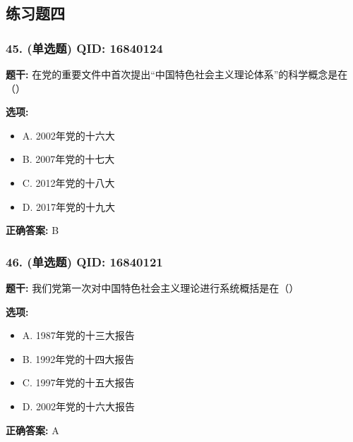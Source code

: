 \documentclass[12pt,UTF8]{ctexart}
\begin{document}
\subsection*{练习题四}

\subsubsection*{45. (单选题) \small QID: 16840124}

\textbf{题干:}
在党的重要文件中首次提出“中国特色社会主义理论体系”的科学概念是在（）

\textbf{选项:}
\begin{itemize}[leftmargin=*]

  \item A. 2002年党的十六大

  \item B. 2007年党的十七大

  \item C. 2012年党的十八大

  \item D. 2017年党的十九大

\end{itemize}

\textbf{正确答案:}
B

\vspace{0.3em}\hrulefill\vspace{0.7em}

\subsubsection*{46. (单选题) \small QID: 16840121}

\textbf{题干:}
我们党第一次对中国特色社会主义理论进行系统概括是在（）

\textbf{选项:}
\begin{itemize}[leftmargin=*]

  \item A. 1987年党的十三大报告

  \item B. 1992年党的十四大报告

  \item C. 1997年党的十五大报告

  \item D. 2002年党的十六大报告

\end{itemize}

\textbf{正确答案:}
A

\vspace{0.3em}\hrulefill\vspace{0.7em}
\end{document}
